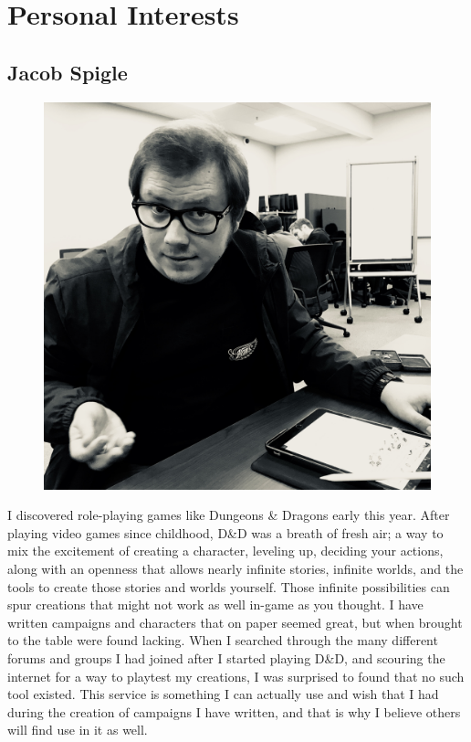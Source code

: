 \documentclass[12pt,a4paper]{report}
\begin{document}
\newpage
\chapter*{Personal Interests}
	\section{Jacob Spigle}
	\begin{figure}
		\includegraphics[scale=0.05]{Jacob_Spigle}
	\end{figure}
	I discovered role-playing games like Dungeons \& Dragons early this year. After playing video games since childhood, D\&D was a breath of fresh air; a way to mix the excitement of creating a character, leveling up, deciding your actions, along with an openness that allows nearly infinite stories, infinite worlds, and the tools to create those stories and worlds yourself. Those infinite possibilities can spur creations that might not work as well in-game as you thought. I have written campaigns and characters that on paper seemed great, but when brought to the table were found lacking. When I searched through the many different forums and groups I had joined after I started playing D\&D, and scouring the internet for a way to playtest my creations, I was surprised to found that no such tool existed. This service is something I can actually use and wish that I had during the creation of campaigns I have written, and that is why I believe others will find use in it as well.
	
\end{document}
